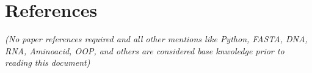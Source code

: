 \documentclass[11pt]{article}
\begin{document}
\section{References}
\textit{(No paper references required and all other mentions like Python, FASTA, DNA, RNA, Aminoacid, OOP, and others are considered base knwoledge prior to reading this document)}
\end{document}
